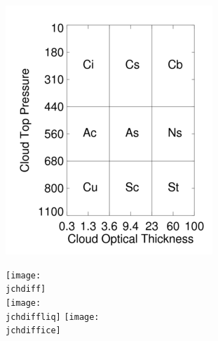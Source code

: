 


\begin{figure}[!ht]
  \begin{minipage}[c]{0.4\textwidth}
    \includegraphics[scale=0.50]{./content/isccp_uebersicht.png} 
  \end{minipage}\hfill
  \begin{minipage}[c]{0.6\textwidth}
    \caption[ISCCP COT-CTP classification.]{\isccp}\label{fig:isccp}
  \end{minipage}
\end{figure}


\begin{figure}[!ht]
  \centering
  \texttt{[image: \\jchdiff]} \\
  \texttt{[image: \\jchdiffliq]}
  \texttt{[image: \\jchdiffice]} 
  \caption[Joint cloud proptery histograms (difference).]{\jchdiffcaption}\label{fig:jchdiff}
\end{figure}


